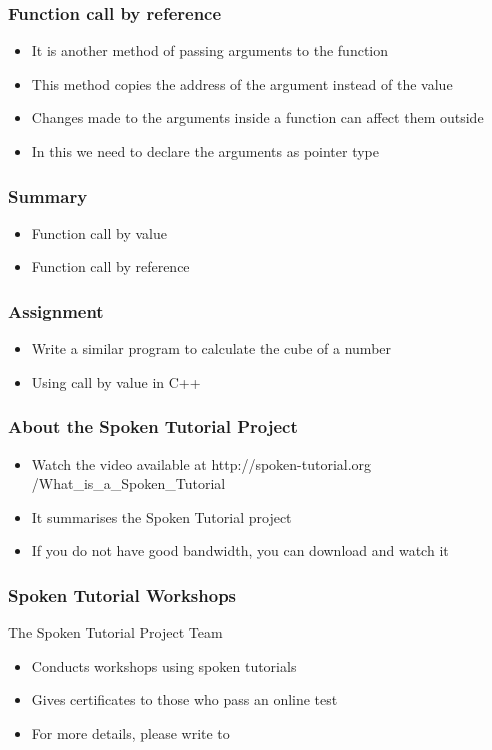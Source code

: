 \documentclass[17pt]{beamer}
\begin{document}
\begin{frame}
  \frametitle{Function call by reference}\pause
  \begin{itemize}[<+-|alert@+>]
\item It is another method of passing arguments to the function
\item This method copies the address of the argument instead of the value
\item Changes made to the arguments inside a function can affect them outside
\item In this we need to declare the arguments as pointer type
 \end{itemize}
  \end{frame}


\begin{frame}
\frametitle{Summary}
\begin{itemize}
\item Function call by value
\item Function call by reference
\end{itemize}
\end{frame}

\begin{frame} 
\frametitle{Assignment}
\begin{itemize}
\item Write a similar program to calculate the cube of a number
\item Using call by value in C++
\end{itemize}
\end{frame}

\begin{frame}
\frametitle{About the Spoken Tutorial Project}
\begin{itemize}
\item Watch the video available at {\color{blue} http://spoken-tutorial.org /What\_is\_a\_Spoken\_Tutorial} 
\item It summarises the Spoken Tutorial project 
\item If you do not have good bandwidth, you can download and watch it
\end{itemize}
\end{frame}

\begin{frame}
\frametitle{Spoken Tutorial Workshops}The Spoken Tutorial Project Team 
\begin{itemize}
\item Conducts workshops using spoken tutorials 
\item Gives certificates to those who pass an online test 
\item For more details, please write to \\ 
\end{itemize}
\end{frame}
\end{document}
